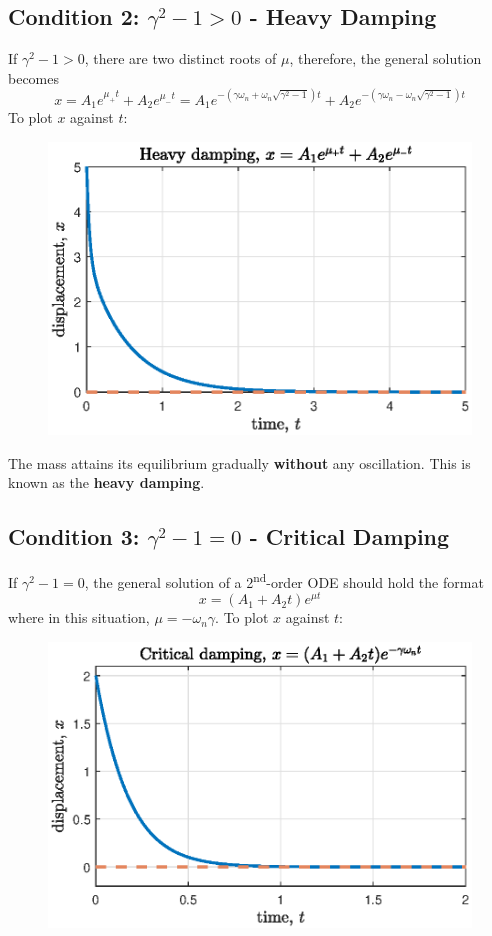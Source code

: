 \documentclass[12pt,a4paper]{article}
\begin{document}
\subsection{Condition 2: $\gamma^{2}-1>0$ - Heavy Damping}
If $\gamma^{2}-1>0$, there are two distinct roots of $\mu$, therefore, the general solution becomes
\begin{equation}
    \boxed{x = A_{1} e^{\mu_{+} t} + A_{2} e^{\mu_{-} t} = 
    A_{1}e^{-(\gamma \omega_{n}+\omega_{n}\sqrt{\gamma^{2}-1})t}+ A_{2}e^{-(\gamma \omega_{n}-\omega_{n}\sqrt{\gamma^{2}-1})t}}
\end{equation}
To plot $x$ against $t$:
\begin{figure}[H]
    \centering
    \includegraphics[width=.7\textwidth]{heavy_damping.eps}
    \label{fig:heavy_damping}
\end{figure}

The mass attains its equilibrium gradually \textbf{without} any oscillation. This is known as the \textbf{heavy damping}.

\subsection{Condition 3: $\gamma^{2}-1=0$ - Critical Damping}
If $\gamma^{2}-1 = 0$, the general solution of a 2\textsuperscript{nd}-order ODE should hold the format 
\begin{equation}
    \boxed{x =  (A_1 + A_2 t) e^{\mu t}}
\end{equation}
where in this situation, $\mu = -\omega_{n}\gamma$. To plot $x$ against $t$:
\begin{figure}[H]
    \centering
    \includegraphics[width=.7\textwidth]{crit_damping.eps}
    \label{fig:crit_damping}
\end{figure}
\end{document}
